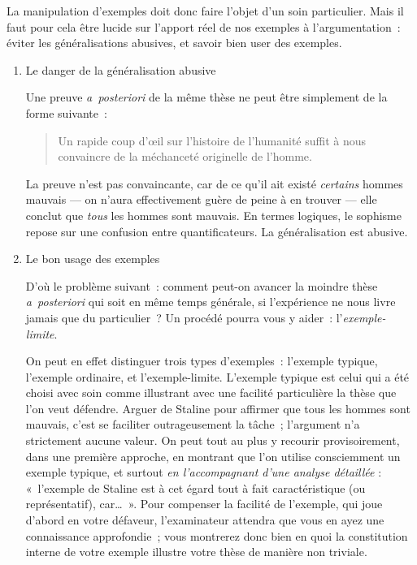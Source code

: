 \documentclass[a4paper]{article}
\begin{document}
La manipulation d'exemples doit donc faire l'objet d'un soin
particulier. Mais il faut pour cela être lucide sur l'apport réel de nos
exemples à l'argumentation : éviter les généralisations abusives, et
savoir bien user des exemples.

\begin{enumerate}
\item Le danger de la généralisation abusive
   
   Une preuve \emph{a posteriori} de la même thèse ne peut être simplement de la
   forme suivante :
   
\begin{quote}
Un rapide coup d'œil sur l'histoire de l'humanité suffit à nous
convaincre de la méchanceté originelle de l'homme.
\end{quote}

   
   La preuve n'est pas convaincante, car de ce qu'il ait existé
   \emph{certains} hommes mauvais --- on n'aura effectivement guère de peine
   à en trouver --- elle conclut que \emph{tous} les hommes sont mauvais. En
   termes logiques, le sophisme repose sur une confusion entre
   quantificateurs. La généralisation est abusive.
\item Le bon usage des exemples
   
   D'où le problème suivant : comment peut-on avancer la moindre thèse
   \emph{a posteriori} qui soit en même temps générale, si l'expérience ne
   nous livre jamais que du particulier ? Un procédé pourra vous y
   aider : l'\emph{exemple-limite}.
   
   On peut en effet distinguer trois types d'exemples : l'exemple
   typique, l'exemple ordinaire, et l'exemple-limite. L'exemple typique
   est celui qui a été choisi avec soin comme illustrant avec une
   facilité particulière la thèse que l'on veut défendre. Arguer de
   Staline pour affirmer que tous les hommes sont mauvais, c'est se
   faciliter outrageusement la tâche ; l'argument n'a strictement aucune
   valeur. On peut tout au plus y recourir provisoirement, dans une
   première approche, en montrant que l'on utilise consciemment un
   exemple typique, et surtout \emph{en l'accompagnant d'une analyse    détaillée} : « l'exemple de Staline est à cet égard tout à fait
   caractéristique (ou représentatif), car\ldots{} ». Pour compenser la
   facilité de l'exemple, qui joue d'abord en votre défaveur,
   l'examinateur attendra que vous en ayez une connaissance
   approfondie ; vous montrerez donc bien en quoi la constitution
   interne de votre exemple illustre votre thèse de manière non
   triviale.
   

\end{enumerate}
\end{document}
